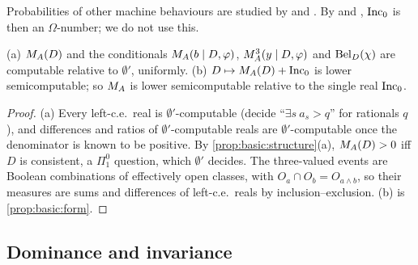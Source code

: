 Probabilities of other machine behaviours are studied by \citet{becher2006randomness} and \citet{barmpalias2016random}. By \citet{kucera2001randomness} and \citet{calude2001recursively}, $\mathrm{Inc}_0$ is then an $\Omega$-number; we do not use this.

\begin{proposition}\label{prop:basic:oracle}
(a) $M_{A}(D)$ and the conditionals $M_{A}(b\mid D,\varphi)$, $M_{A}^{3}(y\mid D,\varphi)$ and $\mathrm{Bel}_D(\chi)$ are computable relative to $\emptyset'$, uniformly. (b) $D\mapsto M_{A}(D)+\mathrm{Inc}_0$ is lower semicomputable; so $M_{A}$ is lower semicomputable relative to the single real $\mathrm{Inc}_0$.
\end{proposition}

\begin{proof}
(a) Every left-c.e.\ real is $\emptyset'$-computable (decide ``$\exists s\ a_s>q$'' for rationals $q$), and differences and ratios of $\emptyset'$-computable reals are $\emptyset'$-computable once the denominator is known to be positive. By \cref{prop:basic:structure}(a), $M_{A}(D)>0$ iff $D$ is consistent, a $\Pi^0_1$ question, which $\emptyset'$ decides. The three-valued events are Boolean combinations of effectively open classes, with $O_a\cap O_b=O_{a\wedge b}$, so their measures are sums and differences of left-c.e.\ reals by inclusion--exclusion. (b) is \cref{prop:basic:form}.
\end{proof}

\subsection{Dominance and invariance}\label{app:basic:dominance}

